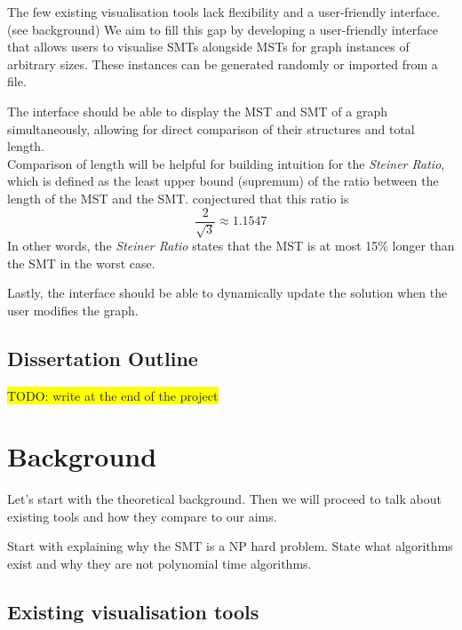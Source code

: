 \documentclass{l4proj}
\begin{document}
The few existing visualisation tools lack flexibility and a user-friendly interface. (see background)
We aim to fill this gap by developing a user-friendly interface that allows users to visualise SMTs alongside MSTs for graph instances of arbitrary sizes. These instances can be generated randomly or imported from a file.

The interface should be able to display the MST and SMT of a graph simultaneously, allowing for direct comparison of their structures and total length.
\\
Comparison of length will be helpful for building intuition for the \textit{Steiner Ratio},  which is defined as the least upper bound (supremum) of the ratio between the length of the MST and the SMT.  \cite{Gilbert1968SteinerMT} conjectured that this ratio is $$\frac{2}{\sqrt{3}} \approx 1.1547$$
In other words, the \textit{Steiner Ratio} states that the MST is at most 15\% longer than the SMT in the worst case.

Lastly, the interface should be able to dynamically update the solution when the user modifies the graph.

\section{Dissertation Outline}

\colorbox{yellow}{TODO: write at the end of the project}





\chapter{Background}
Let's start with the theoretical background. Then we will proceed to talk about existing tools and how they compare to our aims.

Start with explaining why the SMT is a NP hard problem. State what algorithms exist and why they are not polynomial time algorithms.

\section{Existing visualisation tools}
\end{document}
